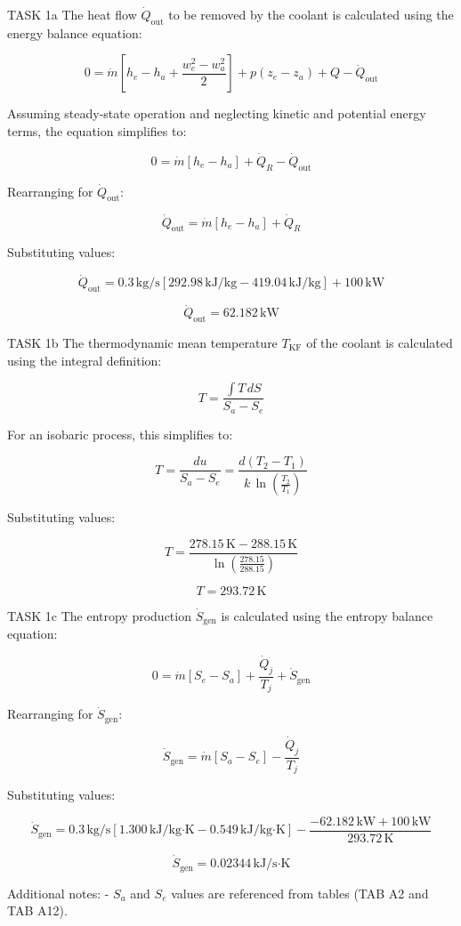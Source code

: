 TASK 1a  
The heat flow \( \dot{Q}_{\text{out}} \) to be removed by the coolant is calculated using the energy balance equation:  

\[
0 = \dot{m} \left[ h_e - h_a + \frac{w_e^2 - w_a^2}{2} \right] + p \left( z_e - z_a \right) + Q - \dot{Q}_{\text{out}}
\]

Assuming steady-state operation and neglecting kinetic and potential energy terms, the equation simplifies to:  

\[
0 = \dot{m} \left[ h_e - h_a \right] + \dot{Q}_R - \dot{Q}_{\text{out}}
\]

Rearranging for \( \dot{Q}_{\text{out}} \):  

\[
\dot{Q}_{\text{out}} = \dot{m} \left[ h_e - h_a \right] + \dot{Q}_R
\]

Substituting values:  

\[
\dot{Q}_{\text{out}} = 0.3 \, \text{kg/s} \left[ 292.98 \, \text{kJ/kg} - 419.04 \, \text{kJ/kg} \right] + 100 \, \text{kW}
\]

\[
\dot{Q}_{\text{out}} = 62.182 \, \text{kW}
\]

TASK 1b  
The thermodynamic mean temperature \( T_{\text{KF}} \) of the coolant is calculated using the integral definition:  

\[
T = \frac{\int T \, dS}{S_a - S_e}
\]

For an isobaric process, this simplifies to:  

\[
T = \frac{du}{S_a - S_e} = \frac{d \left( T_2 - T_1 \right)}{k \, \ln \left( \frac{T_2}{T_1} \right)}
\]

Substituting values:  

\[
T = \frac{278.15 \, \text{K} - 288.15 \, \text{K}}{\ln \left( \frac{278.15}{288.15} \right)}
\]

\[
T = 293.72 \, \text{K}
\]

TASK 1c  
The entropy production \( \dot{S}_{\text{gen}} \) is calculated using the entropy balance equation:  

\[
0 = \dot{m} \left[ S_e - S_a \right] + \frac{\dot{Q}_j}{T_j} + \dot{S}_{\text{gen}}
\]

Rearranging for \( \dot{S}_{\text{gen}} \):  

\[
\dot{S}_{\text{gen}} = \dot{m} \left[ S_a - S_e \right] - \frac{\dot{Q}_j}{T_j}
\]

Substituting values:  

\[
\dot{S}_{\text{gen}} = 0.3 \, \text{kg/s} \left[ 1.300 \, \text{kJ/kg·K} - 0.549 \, \text{kJ/kg·K} \right] - \frac{-62.182 \, \text{kW} + 100 \, \text{kW}}{293.72 \, \text{K}}
\]

\[
\dot{S}_{\text{gen}} = 0.02344 \, \text{kJ/s·K}
\]  

Additional notes:  
- \( S_a \) and \( S_e \) values are referenced from tables (TAB A2 and TAB A12).